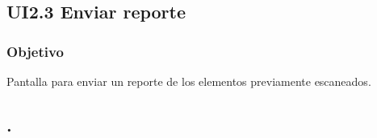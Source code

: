 \newpage
\subsection{UI2.3 Enviar reporte}

\subsubsection{Objetivo}
	Pantalla para enviar un reporte de los elementos previamente escaneados.
		

\subsection{.}
